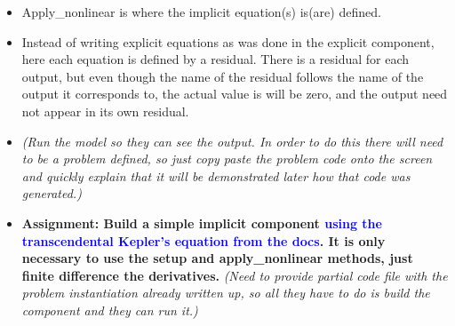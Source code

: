 \documentclass[12pt, letterpaper]{article}
\begin{document}
\begin{itemize}
\begin{itemize}
\begin{itemize}
				\end{itemize}
			\item Apply\_nonlinear is where the implicit equation(s) is(are) defined. 
			\item Instead of writing explicit equations as was done in the explicit component, here each equation is defined by a residual. There is a residual for each output, but even though the name of the residual follows the name of the output it corresponds to, the actual value is will be zero, and the output need not appear in its own residual.
			\item \textit{(Run the model so they can see the output. In order to do this there will need to be a problem defined, so just copy paste the problem code onto the screen and quickly explain that it will be demonstrated later how that code was generated.)}
			\item \textbf{Assignment: Build a simple implicit component \textcolor{blue}{using the transcendental Kepler's equation from the docs}. It is only necessary to use the setup and apply\_nonlinear methods, just finite difference the derivatives.} \textit{(Need to provide partial code file with the problem instantiation already written up, so all they have to do is build the component and they can run it.)}
		\end{itemize}


\end{itemize}
\end{document}
